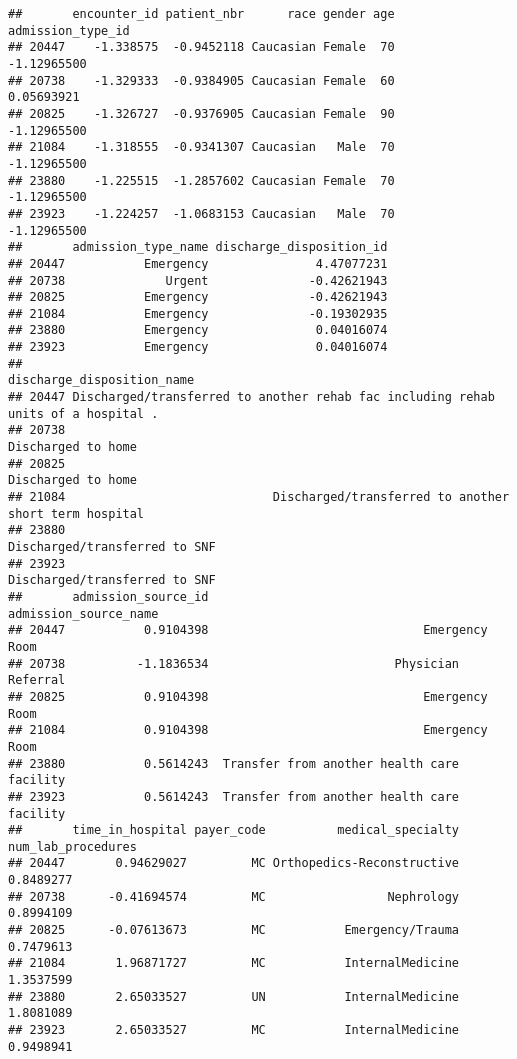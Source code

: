 \documentclass[
]{article}
\begin{document}
\begin{verbatim}
##       encounter_id patient_nbr      race gender age admission_type_id
## 20447    -1.338575  -0.9452118 Caucasian Female  70       -1.12965500
## 20738    -1.329333  -0.9384905 Caucasian Female  60        0.05693921
## 20825    -1.326727  -0.9376905 Caucasian Female  90       -1.12965500
## 21084    -1.318555  -0.9341307 Caucasian   Male  70       -1.12965500
## 23880    -1.225515  -1.2857602 Caucasian Female  70       -1.12965500
## 23923    -1.224257  -1.0683153 Caucasian   Male  70       -1.12965500
##       admission_type_name discharge_disposition_id
## 20447           Emergency               4.47077231
## 20738              Urgent              -0.42621943
## 20825           Emergency              -0.42621943
## 21084           Emergency              -0.19302935
## 23880           Emergency               0.04016074
## 23923           Emergency               0.04016074
##                                                              discharge_disposition_name
## 20447 Discharged/transferred to another rehab fac including rehab units of a hospital .
## 20738                                                                Discharged to home
## 20825                                                                Discharged to home
## 21084                             Discharged/transferred to another short term hospital
## 23880                                                     Discharged/transferred to SNF
## 23923                                                     Discharged/transferred to SNF
##       admission_source_id                       admission_source_name
## 20447           0.9104398                              Emergency Room
## 20738          -1.1836534                          Physician Referral
## 20825           0.9104398                              Emergency Room
## 21084           0.9104398                              Emergency Room
## 23880           0.5614243  Transfer from another health care facility
## 23923           0.5614243  Transfer from another health care facility
##       time_in_hospital payer_code          medical_specialty num_lab_procedures
## 20447       0.94629027         MC Orthopedics-Reconstructive          0.8489277
## 20738      -0.41694574         MC                 Nephrology          0.8994109
## 20825      -0.07613673         MC           Emergency/Trauma          0.7479613
## 21084       1.96871727         MC           InternalMedicine          1.3537599
## 23880       2.65033527         UN           InternalMedicine          1.8081089
## 23923       2.65033527         MC           InternalMedicine          0.9498941

\end{verbatim}
\end{document}
